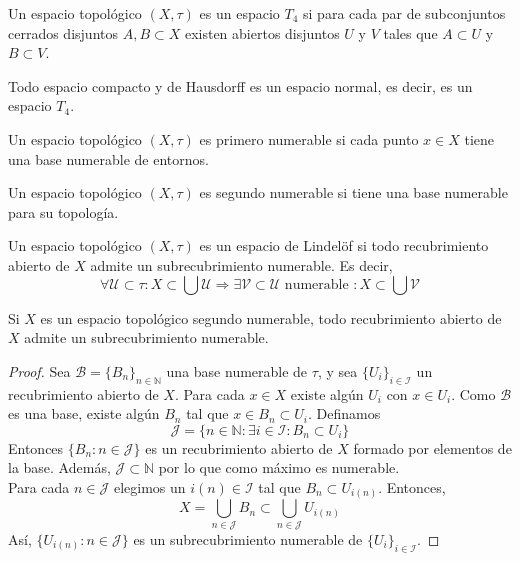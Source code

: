 \begin{definición}
    Un espacio topológico $(X, \tau)$ es un espacio $T_4$ si para cada par de subconjuntos cerrados disjuntos $A, B \subset X$ existen abiertos disjuntos $U$ y $V$ tales que $A \subset U$ y $B \subset V$.
\end{definición}
\begin{corolario}
    Todo espacio compacto y de Hausdorff es un espacio normal, es decir, es un espacio $T_4$.
\end{corolario}
\begin{definición}
    Un espacio topológico $(X, \tau)$ es primero numerable si cada punto $x \in X$ tiene una base numerable de entornos.
\end{definición}
\begin{definición}
    Un espacio topológico $(X, \tau)$ es segundo numerable si tiene una base numerable para su topología.
\end{definición}
\begin{definición}
    Un espacio topológico $(X, \tau)$ es un espacio de Lindelöf si todo recubrimiento abierto de $X$ admite un subrecubrimiento numerable. Es decir, 
    $$\forall \mathcal{U} \subset \tau : X \subset \bigcup \mathcal{U} \Rightarrow \exists \mathcal{V} \subset \mathcal{U} \text{ numerable } : X \subset \bigcup \mathcal{V}$$
    
\end{definición}
\begin{teorema}
    Si $X$ es un espacio topológico segundo numerable, todo recubrimiento abierto de $X$ admite un subrecubrimiento numerable.
\end{teorema}
\begin{proof}
    Sea $\mathcal{B} = \{B_n\}_{n \in \mathbb{N}}$ una base numerable de $\tau$, y sea $\{U_i\}_{i \in \mathcal{I}}$ un recubrimiento abierto de $X$. Para cada $x \in X$ existe algún $U_i$ con $x \in U_i$. Como $\mathcal{B}$ es una base, existe algún $B_n$ tal que $x \in B_n \subset U_i$. Definamos 
    $$\mathcal{J} = \{n \in \mathbb{N} : \exists i \in \mathcal{I} : B_n \subset U_i\}$$
    Entonces $\{B_n : n \in \mathcal{J}\}$ es un recubrimiento abierto de $X$ formado por elementos de la base. Además, $\mathcal{J} \subset \mathbb{N}$ por lo que como máximo es numerable. \\
    Para cada $n \in \mathcal{J}$ elegimos un $i(n) \in \mathcal{I}$ tal que $B_n \subset U_{i(n)}$. Entonces, 
    $$X = \bigcup_{n \in \mathcal{J}} B_n \subset \bigcup_{n \in \mathcal{J}} U_{i(n)}$$
    Así, $\{U_{i(n)} : n \in \mathcal{J}\}$ es un subrecubrimiento numerable de $\{U_i\}_{i \in \mathcal{I}}$.
\end{proof}
